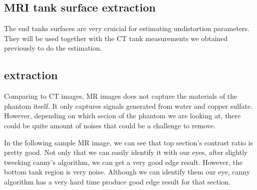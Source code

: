 
\subsection{MRI tank surface extraction}
The end tanks surfaces are very cruicial for estimating undistortion parameters. They will be used together 
with the CT tank measurements we obtained previously to do the estimation.

\subsection{extraction}
Comparing to CT images, MR images does not capture the materials of the phantom itself. It only captures 
signals generated from water and copper sulfate. However, depending on which secion of the phantom we are
looking at, there could be quite amount of noises that could be a challenge to remove. 

In the following sample MR image, we can see that top section's contrast ratio is pretty good. Not only that
we can easily identify it with our eyes, after slightly tweeking canny's algorithm, we can get a very good 
edge result. However, the bottom tank region is very noise. Although we can identify them our eye, canny
algorithm has a very hard time produce good edge result for that section. 

